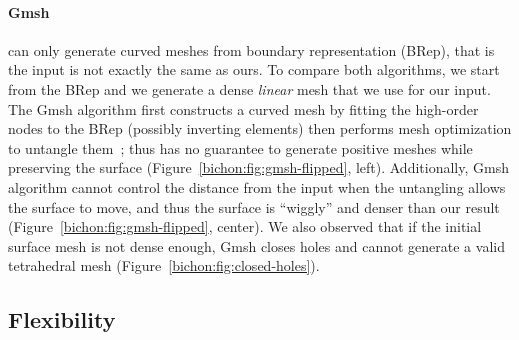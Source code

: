 \paragraph{Gmsh}
\cite{Geuzaine:2009:gmsh} can only generate curved meshes from boundary representation (BRep), that is the input is not exactly the same as ours. To compare both algorithms, we start from the BRep and we generate a dense \emph{linear} mesh that we use for our input. The Gmsh algorithm {first} constructs a curved mesh by fitting the high-order nodes to the BRep (possibly inverting elements) then performs mesh optimization to untangle them~\cite{remacle2013robust}; thus has no guarantee to generate positive meshes while preserving the surface (Figure~\ref{bichon:fig:gmsh-flipped}, left). Additionally, Gmsh algorithm cannot control the distance from the input when the untangling allows the surface to move, and thus the surface is ``wiggly'' and denser than our result (Figure~\ref{bichon:fig:gmsh-flipped}, center). We also observed that if the initial surface mesh is not dense enough, Gmsh closes holes and cannot generate a valid tetrahedral mesh (Figure~\ref{bichon:fig:closed-holes}).


\subsection{Flexibility}

